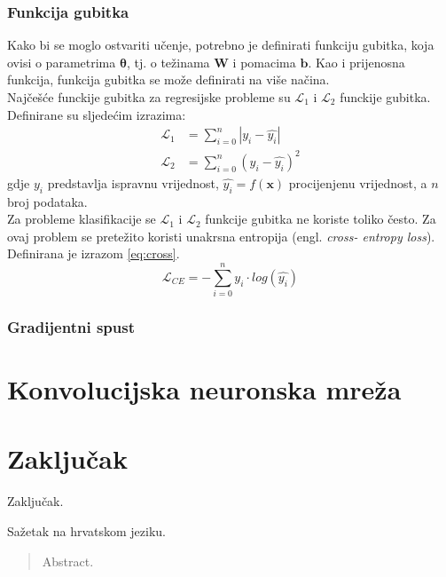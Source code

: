 \documentclass[times, utf8, zavrsni, numeric]{fer}
\renewcommand{\vec}[1]{\mathbf{#1}}
\begin{document}
\subsection{Funkcija gubitka}
Kako bi se moglo ostvariti učenje, potrebno je definirati funkciju gubitka,
koja ovisi o parametrima $\pmb{\theta}$, tj. o težinama $\vec{W}$ i pomacima
$\vec{b}$. Kao i prijenosna funkcija, funkcija gubitka se može definirati
na više načina.
\\\indent Najčešće funckije gubitka za regresijske probleme su $\mathcal{L}_1$ i
$\mathcal{L}_2$ funckije gubitka. Definirane su sljedećim izrazima:
\begin{align}
	\mathcal{L}_1 &= \sum_{i=0}^{n}|y_i - \hat{y_i}| \\
	\mathcal{L}_2 &= \sum_{i=0}^{n}(y_i - \hat{y_i})^2
\end{align}
gdje $y_i$ predstavlja ispravnu vrijednost, $\hat{y_i}=f(\vec{x})$ procijenjenu 
vrijednost, a $n$ broj podataka. 
\\\indent Za probleme klasifikacije se $\mathcal{L}_1$ i $\mathcal{L}_2$ 
funkcije gubitka ne koriste toliko često.
Za ovaj problem se pretežito koristi unakrsna entropija (engl. \textit{cross-
entropy loss}). Definirana je izrazom \ref{eq:cross}.
\begin{equation}
	\mathcal{L}_{CE} = -\sum_{i=0}^n y_i \cdot log(\hat{y_i})
	\label{eq:cross}
\end{equation}

\subsection{Gradijentni spust}

\chapter{Konvolucijska neuronska mreža}

\chapter{Zaključak}
Zaključak.



\nocite{Cupic-UNN}
\nocite{Goodfellow-et-al-2016}


\begin{sazetak}
Sažetak na hrvatskom jeziku.

\end{sazetak}

\begin{abstract}
Abstract.

\end{abstract}
\end{document}
